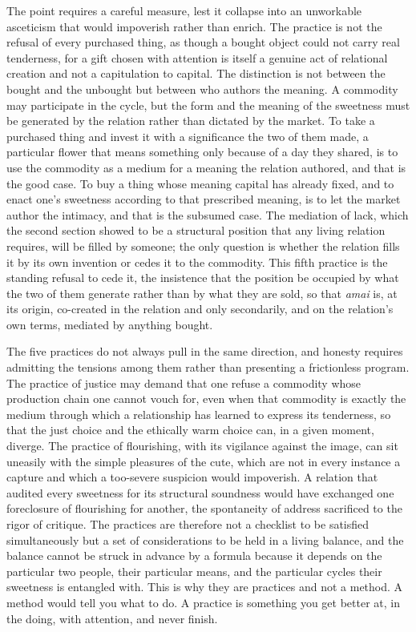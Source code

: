 The point requires a careful measure, lest it collapse into an unworkable asceticism that would impoverish rather than enrich. The practice is not the refusal of every purchased thing, as though a bought object could not carry real tenderness, for a gift chosen with attention is itself a genuine act of relational creation and not a capitulation to capital. The distinction is not between the bought and the unbought but between who authors the meaning. A commodity may participate in the cycle, but the form and the meaning of the sweetness must be generated by the relation rather than dictated by the market. To take a purchased thing and invest it with a significance the two of them made, a particular flower that means something only because of a day they shared, is to use the commodity as a medium for a meaning the relation authored, and that is the good case. To buy a thing whose meaning capital has already fixed, and to enact one's sweetness according to that prescribed meaning, is to let the market author the intimacy, and that is the subsumed case. The mediation of lack, which the second section showed to be a structural position that any living relation requires, will be filled by someone; the only question is whether the relation fills it by its own invention or cedes it to the commodity. This fifth practice is the standing refusal to cede it, the insistence that the position be occupied by what the two of them generate rather than by what they are sold, so that \textit{amai} is, at its origin, co-created in the relation and only secondarily, and on the relation's own terms, mediated by anything bought.

The five practices do not always pull in the same direction, and honesty requires admitting the tensions among them rather than presenting a frictionless program. The practice of justice may demand that one refuse a commodity whose production chain one cannot vouch for, even when that commodity is exactly the medium through which a relationship has learned to express its tenderness, so that the just choice and the ethically warm choice can, in a given moment, diverge. The practice of flourishing, with its vigilance against the image, can sit uneasily with the simple pleasures of the cute, which are not in every instance a capture and which a too-severe suspicion would impoverish. A relation that audited every sweetness for its structural soundness would have exchanged one foreclosure of flourishing for another, the spontaneity of address sacrificed to the rigor of critique. The practices are therefore not a checklist to be satisfied simultaneously but a set of considerations to be held in a living balance, and the balance cannot be struck in advance by a formula because it depends on the particular two people, their particular means, and the particular cycles their sweetness is entangled with. This is why they are practices and not a method. A method would tell you what to do. A practice is something you get better at, in the doing, with attention, and never finish.

